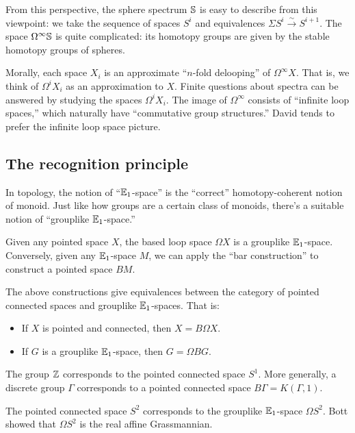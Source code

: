 \documentclass{article}
\begin{document}
\begin{ex}
  From this perspective, the sphere spectrum $\mathbb{S}$ is easy to describe from this viewpoint: we take the sequence of spaces $S^i$ and equivalences $\Sigma S^i \xrightarrow{\sim} S^{i+1}$.
  The space $\Omega^\infty \mathbb{S}$ is quite complicated: its homotopy groups are given by the stable homotopy groups of spheres.
\end{ex}

Morally, each space $X_i$ is an approximate ``$n$-fold delooping'' of $\Omega^\infty X$.
That is, we think of $\Omega^i X_i$ as an approximation to $X$.
Finite questions about spectra can be answered by studying the spaces $\Omega^i X_i$.
The image of $\Omega^\infty$ consists of ``infinite loop spaces,'' which naturally have ``commutative group structures.''
David tends to prefer the infinite loop space picture.

\subsection{The recognition principle}

In topology, the notion of ``$\mathbb{E}_1$-space'' is the ``correct'' homotopy-coherent notion of monoid.
Just like how groups are a certain class of monoids, there's a suitable notion of ``grouplike $\mathbb{E}_1$-space.''

Given any pointed space $X$, the based loop space $\Omega X$ is a grouplike $\mathbb{E}_1$-space.
Conversely, given any $\mathbb{E}_1$-space $M$, we can apply the ``bar construction'' to construct a pointed space $BM$.

\begin{thm}
  The above constructions give equivalences between the category of pointed connected spaces and grouplike $\mathbb{E}_1$-spaces.
  That is:
  \begin{itemize}
    \item If $X$ is pointed and connected, then $X = B\Omega X$.
    \item If $G$ is a grouplike $\mathbb{E}_1$-space, then $G = \Omega BG$.
  \end{itemize}
\end{thm}

\begin{ex}
  The group $\mathbb{Z}$ corresponds to the pointed connected space $S^1$.
  More generally, a discrete group $\Gamma$ corresponds to a pointed connected space $B\Gamma = K(\Gamma, 1)$.
\end{ex}

\begin{ex}
  The pointed connected space $S^2$ corresponds to the grouplike $\mathbb{E}_1$-space $\Omega S^2$.
  Bott showed that $\Omega S^2$ is the real affine Grassmannian.
\end{ex}
\end{document}

